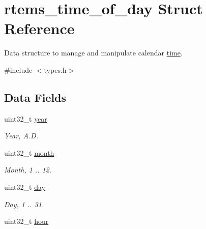 \hypertarget{structrtems__time__of__day}{}\section{rtems\+\_\+time\+\_\+of\+\_\+day Struct Reference}
\label{structrtems__time__of__day}


Data structure to manage and manipulate calendar \mbox{\hyperlink{group__RTEMSAPIClassic_ClassicRTEMSSecTime}{time}}.  




{\ttfamily \#include $<$types.\+h$>$}

\subsection*{Data Fields}
\begin{DoxyCompactItemize}
\item 
\mbox{\label{structrtems__time__of__day_ac5e9a6f16d2ff968dbc541897dc706b9}} 
uint32\+\_\+t \mbox{\hyperlink{structrtems__time__of__day_ac5e9a6f16d2ff968dbc541897dc706b9}{year}}
\begin{DoxyCompactList}\small\item\em Year, A.\+D. \end{DoxyCompactList}\item 
\mbox{\label{structrtems__time__of__day_ac1bcb43af10ff14a634b9fc2fe25f485}} 
uint32\+\_\+t \mbox{\hyperlink{structrtems__time__of__day_ac1bcb43af10ff14a634b9fc2fe25f485}{month}}
\begin{DoxyCompactList}\small\item\em Month, 1 .. 12. \end{DoxyCompactList}\item 
\mbox{\label{structrtems__time__of__day_a9d16d4ce754dce6ea4e36209d45600ce}} 
uint32\+\_\+t \mbox{\hyperlink{structrtems__time__of__day_a9d16d4ce754dce6ea4e36209d45600ce}{day}}
\begin{DoxyCompactList}\small\item\em Day, 1 .. 31. \end{DoxyCompactList}\item 
\mbox{\label{structrtems__time__of__day_a17e832c94fb2c33537bea6dce072a1d8}} 
uint32\+\_\+t \mbox{\hyperlink{structrtems__time__of__day_a17e832c94fb2c33537bea6dce072a1d8}{hour}}

\end{DoxyCompactItemize}

